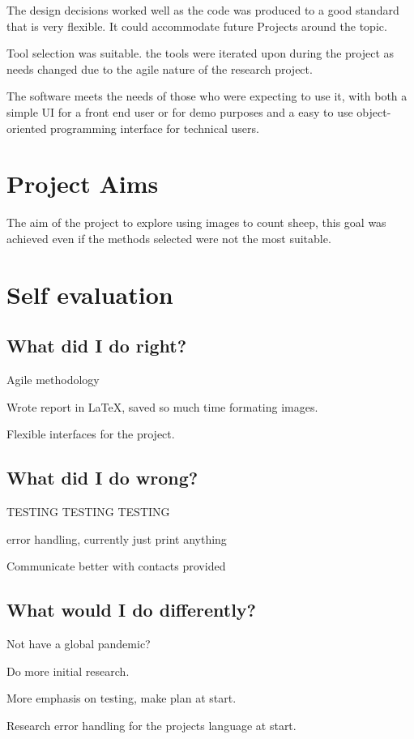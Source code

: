 The design decisions worked well as the code was produced to a good standard that is very flexible. It could accommodate future Projects around the topic.


Tool selection was suitable. the tools were iterated upon during the project as needs changed due to the agile nature of the research project.

The software meets the needs of those who were expecting to use it, with both a simple UI for a front end user or for demo purposes and a easy to use object-oriented programming interface for technical users.

\section{Project Aims}

The aim of the project to explore using images to count sheep, this goal was achieved even if the methods selected were not the most suitable.


\section{Self evaluation}

\subsection{What did I do right?}

Agile methodology

Wrote report in \LaTeX, saved so much time formating images.

Flexible interfaces for the project.

\subsection{What did I do wrong?}

TESTING TESTING TESTING

error handling, currently just print anything

Communicate better with contacts provided

\subsection{What would I do differently?}

Not have a global pandemic?

Do more initial research.

More emphasis on testing, make plan at start.

Research error handling for the projects language at start.

